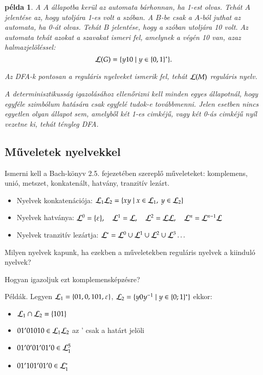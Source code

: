 \documentclass[a4paper]{article}
\newtheorem{pelda}{példa}[section]
\begin{document}
\begin{pelda}
A $A$ állapotba kerül az automata bárhonnan, ha 1-est olvas. Tehát $A$
jelentése az, hogy utoljára 1-es volt a szóban. A $B$-be csak a
$A$-ból juthat az automata, ha 0-át olvas. Tehát $B$ jelentése, hogy
a szóban utoljára 10 volt. Az automata tehát azokat a szavakat ismeri
fel, amelynek a végén 10 van, azaz halmazjelöléssel:
\[{\cal L}(G) = \{y10 \mid y \in \{0,1\}^*\}.\]

Az DFA-k pontosan a reguláris nyelveket ismerik fel, tehát ${\cal L}
(M)$ reguláris nyelv.

A determinisztikusság igazolásához ellenőrizni kell minden egyes
állapotnál, hogy egyféle szimbólum hatására csak egyfelé tudok-e
továbbmenni. Jelen esetben nincs egyetlen olyan állapot sem, amelyből
két 1-es cimkéjű, vagy két 0-ás cimkéjű nyíl vezetne ki, tehát tényleg
DFA.
\end{pelda}


\subsection{Műveletek nyelvekkel}

Ismerni kell a Bach-könyv 2.5. fejezetében szereplő műveleteket:
komplemens, unió, metszet, konkatenált, hatvány, tranzitív lezárt.

\begin{itemize}
    \item Nyelvek konkatenációja: ${\cal L}_1{\cal L}_2 =
        \{xy \mid x \in {\cal L}_1,\: y \in {\cal L}_2\}$
    \item Nyelvek hatványa:  ${\cal L}^0=\{\varepsilon\},\quad
        {\cal L}^1={\cal L},\quad
        {\cal L}^2= {\cal L}{\cal L},\quad
        {\cal L}^n={\cal L}^{n-1}{\cal L}$
    \item Nyelvek tranzitív lezártja:  ${\cal L}^*={\cal L}^0 \cup{\cal
        L}^1 \cup{\cal L}^2 \cup{\cal L}^3 \dots$
\end{itemize}

Milyen nyelvek kapunk, ha ezekben a műveletekben reguláris nyelvek a
kiinduló nyelvek?

Hogyan igazoljuk ezt komplemensképzésre?

Példák. Legyen
${\cal L}_1 = \{01, 0, 101, \varepsilon \}$,\quad
      ${\cal L}_2 = \{y0y^{-1} \mid y\in \{0; 1\}^*\}$
      ekkor:
\begin{itemize}
\item ${\cal L}_1 \cap {\cal L}_2 = \{101\}$
\item $01'01010 \in {\cal L}_1{\cal L}_2$ \quad az ' csak a határt jelöli
\item $01'0'01'01'0 \in {\cal L}_1^5$
\item $01'101'01'0 \in {\cal L}_1^*$
\end{itemize}
\end{document}
